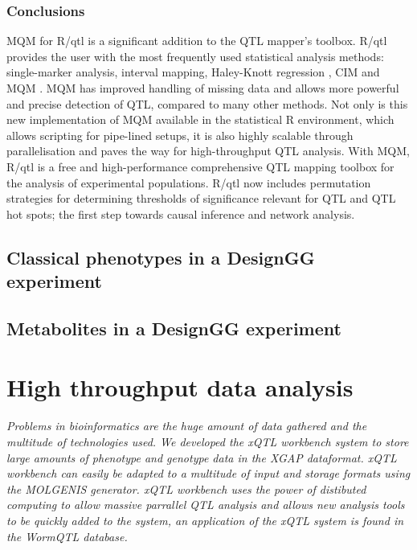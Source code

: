 \documentclass[8pt, twoside, a5paper]{report}
\begin{document}
\subsection{Conclusions}
MQM for R/qtl is a significant addition to the QTL mapper's toolbox. R/qtl provides the user with the most frequently 
used statistical analysis methods: single-marker analysis, interval mapping, Haley-Knott regression \cite{Haley:1992}, 
CIM \cite{Zeng:1994} and MQM \cite{Jansen:1994a}.  MQM has improved handling of missing data and allows more powerful 
and precise detection of QTL, compared to many other methods. Not only is this new implementation of MQM available in the
statistical R environment, which allows scripting for pipe-lined setups, it is also highly scalable through 
parallelisation and paves the way for high-throughput QTL analysis. With MQM, R/qtl is a free and high-performance 
comprehensive QTL mapping toolbox for the analysis of experimental populations. R/qtl now includes permutation strategies 
for determining thresholds of significance relevant for QTL and QTL hot spots; the first step towards causal inference and
network analysis.

\section{Classical phenotypes in a DesignGG experiment}
\lipsum

\section{Metabolites in a DesignGG experiment}
\lipsum

\chapter{High throughput data analysis}

\emph{Problems in bioinformatics are the huge amount of data gathered and the multitude of technologies used. We 
developed the xQTL workbench system\cite{Arends:2012} to store large amounts of phenotype and genotype data 
in the XGAP\cite{Swertz:2010a} dataformat. xQTL workbench can easily be adapted to a multitude of input and 
storage formats using the MOLGENIS\cite{Swertz:2004} generator. xQTL workbench uses the power of distibuted 
computing to allow massive parrallel QTL analysis and allows new analysis tools to be quickly added to the 
system, an application of the xQTL system is found in the WormQTL database\cite{Snoek:2012}.}
\end{document}
